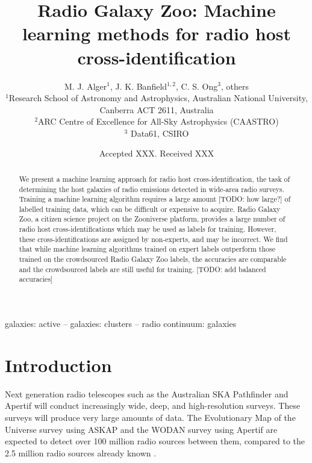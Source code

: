 \documentclass[fleqn,usenatbib,usedcolumn]{mnras}
\title[ML CDFS]{Radio Galaxy Zoo: Machine learning methods for radio host cross-identification}
\author[RGZ ML Team]{M. J. Alger$^{1}$, J. K. Banfield$^{1, 2}$, C. S. Ong$^{3}$, others
\\
$^{1}$Research School of Astronomy and Astrophysics, Australian National University, Canberra ACT 2611, Australia\\
$^{2}$ARC Centre of Excellence for All-Sky Astrophysics (CAASTRO)\\
$^{3}$ Data61, CSIRO\\
}
\date{Accepted XXX. Received XXX}
\begin{document}
\label{firstpage}
\pagerange{\pageref{firstpage}--\pageref{lastpage}}
\maketitle

\begin{abstract}
  We present a machine learning approach for radio host cross-identification,
  the task of determining the host galaxies of radio emissions detected in
  wide-area radio surveys. Training a machine learning algorithm requires a
  large amount [TODO: how large?] of labelled training data, which can be
  difficult or expensive to acquire. Radio Galaxy Zoo, a citizen science
  project on the Zooniverse platform, provides a large number of radio host
  cross-identifications which may be used as labels for training. However,
  these cross-identifications are assigned by non-experts, and may be
  incorrect. We find that while machine learning algorithms trained on expert
  labels outperform those trained on the crowdsourced Radio Galaxy Zoo labels,
  the accuracies are comparable and the crowdsourced labels are still useful
  for training. [TODO: add balanced accuracies]
\end{abstract}

\begin{keywords}
galaxies: active -- galaxies: clusters -- radio continuum: galaxies
\end{keywords}


\section{Introduction}\label{introduction}

  Next generation radio telescopes such as the Australian SKA Pathfinder
  \citep[ASKAP;][]{johnston07} and Apertif \citep{verheijen08} will
  conduct increasingly wide, deep, and high-resolution surveys. These
  surveys will produce very large amounts of data. The Evolutionary Map of
  the Universe survey \citep[EMU;][]{norris11} using ASKAP and the WODAN
  survey \citep{rottgering11} using Apertif are expected to detect
  over 100 million radio sources between them, compared to the 2.5 million
  radio sources already known \citep{banfield15}.
\end{document}
